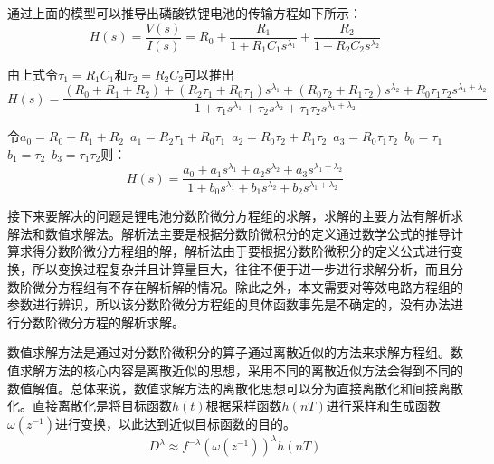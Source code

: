 通过上面的模型可以推导出磷酸铁锂电池的传输方程如下所示：
\begin{equation}
H(s)=\frac{V(s)}{I(s)}={{R}_{0}}+\frac{{{R}_{1}}}{1+{{R}_{1}}{{C}_{1}}{{s}^{{{\lambda }_{1}}}}}+\frac{{{R}_{2}}}{1+{{R}_{2}}{{C}_{2}}{{s}^{{{\lambda }_{2}}}}}
\end{equation}	 

由上式令${{\tau }_{1}}={{R}_{1}}{{C}_{1}}$和${{\tau }_{2}}={{R}_{2}}{{C}_{2}}$可以推出
\begin{equation}
H\left( s \right)=\frac{\left( {{R}_{0}}+{{R}_{1}}+{{R}_{2}} \right)+\left( {{R}_{2}}{{\tau }_{1}}+{{R}_{0}}{{\tau }_{1}} \right){{s}^{{{\lambda }_{1}}}}+\left( {{R}_{0}}{{\tau }_{2}}+{{R}_{1}}{{\tau }_{2}} \right){{s}^{{{\lambda }_{2}}}}+{{R}_{0}}{{\tau }_{1}}{{\tau }_{2}}{{s}^{{{\lambda }_{1}}+{{\lambda }_{2}}}}}{1+{{\tau }_{1}}{{s}^{{{\lambda }_{1}}}}+{{\tau }_{2}}{{s}^{{{\lambda }_{2}}}}+{{\tau }_{1}}{{\tau }_{2}}{{s}^{{{\lambda }_{1}}+{{\lambda }_{2}}}}}
\end{equation}

令${{a}_{0}}={{R}_{0}}+{{R}_{1}}+{{R}_{2}}$~${{a}_{1}}={{R}_{2}}{{\tau }_{1}}+{{R}_{0}}{{\tau }_{1}}$~${{a}_{2}}={{R}_{0}}{{\tau }_{2}}+{{R}_{1}}{{\tau }_{2}}$~${{a}_{3}}={{R}_{0}}{{\tau }_{1}}{{\tau }_{2}}$~${{b}_{0}}={{\tau }_{1}}$~${{b}_{1}}={{\tau }_{2}}$~${{b}_{3}}={{\tau }_{1}}{{\tau }_{2}}$则：
\begin{equation}
H\left( s \right)=\frac{{{a}_{0}}+{{a}_{1}}{{s}^{{{\lambda }_{1}}}}+{{a}_{2}}{{s}^{{{\lambda }_{2}}}}+{{a}_{3}}{{s}^{{{\lambda }_{1}}+{{\lambda }_{2}}}}}{1+{{b}_{0}}{{s}^{{{\lambda }_{1}}}}+{{b}_{1}}{{s}^{{{\lambda }_{2}}}}+{{b}_{2}}{{s}^{{{\lambda }_{1}}+{{\lambda }_{2}}}}}
\end{equation}

接下来要解决的问题是锂电池分数阶微分方程组的求解，求解的主要方法有解析求解法和数值求解法。解析法主要是根据分数阶微积分的定义通过数学公式的推导计算求得分数阶微分方程组的解，解析法由于要根据分数阶微积分的定义公式进行变换，所以变换过程复杂并且计算量巨大，往往不便于进一步进行求解分析，而且分数阶微分方程组有不存在解析解的情况。除此之外，本文需要对等效电路方程组的参数进行辨识，所以该分数阶微分方程组的具体函数事先是不确定的，没有办法进行分数阶微分方程的解析求解。

数值求解方法是通过对分数阶微积分的算子通过离散近似的方法来求解方程组。数值求解方法的核心内容是离散近似的思想，采用不同的离散近似方法会得到不同的数值解值。总体来说，数值求解方法的离散化思想可以分为直接离散化和间接离散化。直接离散化是将目标函数$h\left( t \right)$根据采样函数$h\left( nT \right)$进行采样和生成函数$\omega \left( {{z}^{-1}} \right)$进行变换，以此达到近似目标函数的目的。
\begin{equation}
{{D}^{\lambda }}\approx {{f}^{-\lambda }}{{\left( \omega \left( {{z}^{-1}} \right) \right)}^{\lambda }}h\left( nT \right)
\end{equation}

